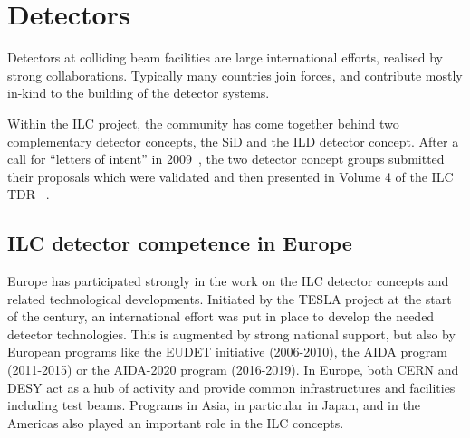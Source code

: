 \documentclass[%
 reprint,
 floatfix,
 amsmath,amssymb,
 aps,
]{revtex4-1}
\begin{document}
\section{\label{sec:det}Detectors}

Detectors at colliding beam facilities are large international efforts, realised by strong collaborations. 
Typically many countries join forces, and contribute mostly in-kind to the building of the detector systems. 

Within the ILC project, the community has come together behind two complementary detector concepts, the SiD and the ILD detector concept. 
After a call for ``letters of intent'' in 2009~\cite{Aihara:2009ad,Abe:2010aa}, the two detector concept groups submitted their proposals 
which were validated and then presented in Volume 4 of the ILC TDR ~\cite{Behnke:2013lya}.

\subsection{ILC detector competence in Europe~\label{sec:det:competence}}
Europe has participated strongly in the work on the ILC detector concepts and 
related technological developments. Initiated by the TESLA project at the start 
of the century, an international effort was put in place to develop the needed 
detector technologies. This is augmented by strong national support, but also by 
European programs like the EUDET initiative (2006-2010), the AIDA program 
(2011-2015) or the AIDA-2020 program (2016-2019). In Europe, both CERN and DESY 
act as a hub of activity and provide common infrastructures and facilities 
including test beams. Programs in Asia, in particular in Japan, and in the 
Americas also played an important role in the ILC concepts. 

\end{document}
